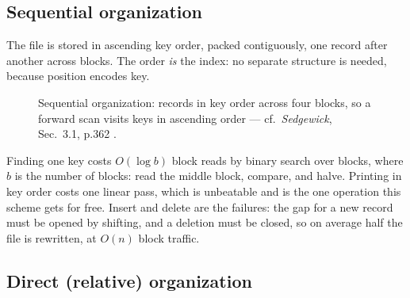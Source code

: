 \documentclass[11pt]{article}
\begin{document}
\subsection{Sequential organization}

The file is stored in ascending key order, packed contiguously, one record after another across blocks. The order \emph{is} the index: no separate structure is needed, because position encodes key.

\begin{figure}[h]
  \centering
  \caption{Sequential organization: records in key order across four blocks, so a forward scan visits keys in ascending order --- cf.\ \textit{Sedgewick}, Sec.~3.1, p.362 \cite{Sedgewick2011_algorithms}.}
\end{figure}

Finding one key costs $O(\log b)$ block reads by binary search over blocks, where $b$ is the number of blocks: read the middle block, compare, and halve. Printing in key order costs one linear pass, which is unbeatable and is the one operation this scheme gets for free. Insert and delete are the failures: the gap for a new record must be opened by shifting, and a deletion must be closed, so on average half the file is rewritten, at $O(n)$ block traffic.

\subsection{Direct (relative) organization}
\end{document}
